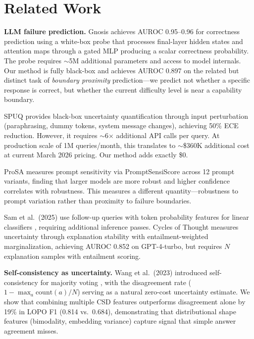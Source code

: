 \documentclass[11pt,letterpaper]{article}
\begin{document}
\section{Related Work}
\label{sec:related}

\textbf{LLM failure prediction.} Gnosis \cite{ghasemabadi2025gnosis} achieves AUROC 0.95--0.96 for correctness prediction using a white-box probe that processes final-layer hidden states and attention maps through a gated MLP producing a scalar correctness probability. The probe requires $\sim$5M additional parameters and access to model internals. Our method is fully black-box and achieves AUROC 0.897 on the related but distinct task of \emph{boundary proximity} prediction---we predict not whether a specific response is correct, but whether the current difficulty level is near a capability boundary.

SPUQ \cite{gao2024spuq} provides black-box uncertainty quantification through input perturbation (paraphrasing, dummy tokens, system message changes), achieving 50\% ECE reduction. However, it requires $\sim$6$\times$ additional API calls per query. At production scale of 1M queries/month, this translates to $\sim$\$360K additional cost at current March 2026 pricing. Our method adds exactly \$0.

ProSA \cite{zhuo2024prosa} measures prompt sensitivity via PromptSensiScore across 12 prompt variants, finding that larger models are more robust and higher confidence correlates with robustness. This measures a different quantity---robustness to prompt variation rather than proximity to failure boundaries.

Sam et al.~(2025) use follow-up queries with token probability features for linear classifiers \cite{sam2025predicting}, requiring additional inference passes. Cycles of Thought \cite{cycles2024} measures uncertainty through explanation stability with entailment-weighted marginalization, achieving AUROC 0.852 on GPT-4-turbo, but requires $N$ explanation samples with entailment scoring.

\textbf{Self-consistency as uncertainty.} Wang et al.~(2023) introduced self-consistency for majority voting \cite{wang2023selfconsistency}, with the disagreement rate ($1 - \max_a \text{count}(a)/N$) serving as a natural zero-cost uncertainty estimate. We show that combining multiple CSD features outperforms disagreement alone by 19\% in LOPO F1 (0.814 vs.\ 0.684), demonstrating that distributional shape features (bimodality, embedding variance) capture signal that simple answer agreement misses.
\end{document}
